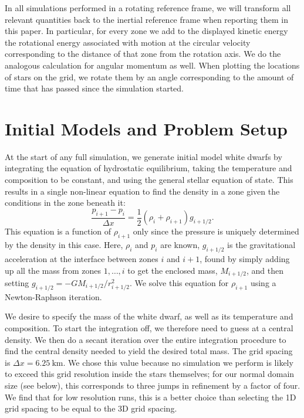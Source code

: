 \documentclass[iop]{emulateapj}
\begin{document}
In all simulations performed in a rotating reference frame, we will transform all relevant
quantities back to the inertial reference frame when reporting them in this paper. In particular,
for every zone we add to the displayed kinetic energy the rotational energy associated with motion 
at the circular velocity corresponding to the distance of that zone from the rotation axis.
We do the analogous calculation for angular momentum as well. When plotting the locations of 
stars on the grid, we rotate them by an angle corresponding to the amount of time that has 
passed since the simulation started.


\section{Initial Models and Problem Setup}
\label{sec:initial_models}

At the start of any full simulation, we generate initial model white
dwarfs by integrating the equation of hydrostatic equilibrium, taking
the temperature and composition to be constant, and using the general
stellar equation of state.  This results in a single non-linear
equation to find the density in a zone given the conditions in the
zone beneath it:
\begin{equation}
\frac{p_{i+1} - p_i}{\Delta x} = \frac{1}{2} (\rho_i + \rho_{i+1}) g_{i+1/2}.
\end{equation}
This equation is a function of $\rho_{i+1}$ only since the pressure is
uniquely determined by the density in this case. Here, $\rho_i$ and $p_i$
are known, $g_{i+1/2}$ is the gravitational acceleration at the
interface between zones $i$ and $i+1$, found by simply adding up all
the mass from zones $1, \ldots, i$ to get the enclosed mass,
$M_{i+1/2}$, and then setting $g_{i+1/2} =
-GM_{i+1/2}/r_{i+1/2}^2$. We solve this equation for $\rho_{i+1}$
using a Newton-Raphson iteration.

We desire to specify the mass of the white dwarf, as well as its
temperature and composition. To start the integration off, we
therefore need to guess at a central density.  We then do a secant
iteration over the entire integration procedure to find the central
density needed to yield the desired total mass.  The grid spacing is
$\Delta x = 6.25\ \text{km}$. We chose this value because no simulation
we perform is likely to exceed this grid resolution inside the stars 
themselves; for our normal domain size (see below), this corresponds to 
three jumps in refinement by a factor of four. We find that for low 
resolution runs, this is a better choice than selecting the 1D grid 
spacing to be equal to the 3D grid spacing.
\end{document}
